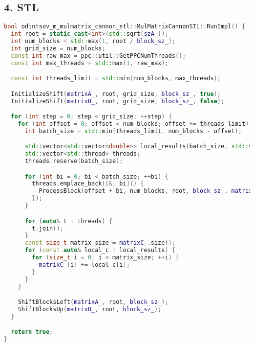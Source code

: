 \documentclass[12pt]{article}
\begin{document}
\subsection*{4. STL}
\begin{lstlisting}[language=C++,  breaklines=true]
bool odintsov_m_mulmatrix_cannon_stl::MulMatrixCannonSTL::RunImpl() {
  int root = static_cast<int>(std::sqrt(szA_));
  int num_blocks = std::max(1, root / block_sz_);
  int grid_size = num_blocks;
  const int raw_max = ppc::util::GetPPCNumThreads();
  const int max_threads = std::max(1, raw_max);

  const int threads_limit = std::min(num_blocks, max_threads);

  InitializeShift(matrixA_, root, grid_size, block_sz_, true);
  InitializeShift(matrixB_, root, grid_size, block_sz_, false);

  for (int step = 0; step < grid_size; ++step) {
    for (int offset = 0; offset < num_blocks; offset += threads_limit) {
      int batch_size = std::min(threads_limit, num_blocks - offset);

      std::vector<std::vector<double>> local_results(batch_size, std::vector<double>(root * root, 0.0));
      std::vector<std::thread> threads;
      threads.reserve(batch_size);

      for (int bi = 0; bi < batch_size; ++bi) {
        threads.emplace_back([&, bi]() {
          ProcessBlock(offset + bi, num_blocks, root, block_sz_, matrixA_, matrixB_, local_results[bi]);
        });
      }

      for (auto& t : threads) {
        t.join();
      }
      const size_t matrix_size = matrixC_.size();
      for (const auto& local_c : local_results) {
        for (size_t i = 0; i < matrix_size; ++i) {
          matrixC_[i] += local_c[i];
        }
      }
    }

    ShiftBlocksLeft(matrixA_, root, block_sz_);
    ShiftBlocksUp(matrixB_, root, block_sz_);
  }

  return true;
}
\end{lstlisting}
\end{document}
